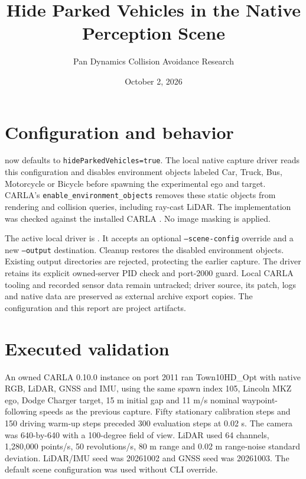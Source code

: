 \documentclass[11pt]{article}
\title{Hide Parked Vehicles in the Native Perception Scene}
\author{Pan Dynamics Collision Avoidance Research}
\date{October 2, 2026}
\begin{document}
\maketitle

\section{Configuration and behavior}
 now defaults to
\texttt{hideParkedVehicles=true}. The local native capture driver reads this
configuration and disables environment objects labeled Car, Truck, Bus,
Motorcycle or Bicycle before spawning the experimental ego and target.
CARLA's \texttt{enable\_environment\_objects} removes these static objects
from rendering and collision queries, including ray-cast LiDAR.
The implementation was checked against the installed CARLA
. No image masking is applied.

The active local driver is
.
It accepts an optional \texttt{--scene-config} override and a new
\texttt{--output} destination. Cleanup restores the disabled environment
objects. Existing output directories are rejected, protecting the earlier
capture. The driver retains its explicit owned-server PID check and port-2000
guard. Local CARLA tooling and recorded sensor data remain untracked;
driver source, its patch, logs and native data are preserved as external
archive export copies. The configuration and this report are project artifacts.

\section{Executed validation}
An owned CARLA 0.10.0 instance on port 2011 ran Town10HD\_Opt with native
RGB, LiDAR, GNSS and IMU, using the same spawn index 105, Lincoln MKZ ego,
Dodge Charger target, 15 m initial gap and 11 m/s nominal waypoint-following
speeds as the previous capture. Fifty stationary calibration steps and
150 driving warm-up steps preceded 300 evaluation steps at 0.02 s.
The camera was 640-by-640 with a 100-degree field of view. LiDAR used
64 channels, 1,280,000 points/s, 50 revolutions/s, 80 m range and 0.02 m
range-noise standard deviation. LiDAR/IMU seed was 20261002 and GNSS seed
was 20261003. The default scene configuration was used without CLI override.
\end{document}

